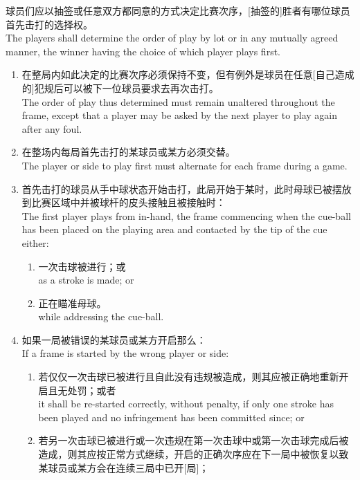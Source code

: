 \noindent 球员们应以抽签或任意双方都同意的方式决定比赛次序，[抽签的]胜者有哪位球员首先击打的选择权。\\
The players shall determine the order of play by lot or in any mutually agreed manner, the winner having the choice of which player plays first.
\begin{enumerate}[label=(\alph*)]
    \item 在整局内如此决定的比赛次序必须保持不变，但有例外是球员在任意[自己造成的]犯规后可以被下一位球员要求去再次击打。\\
    The order of play thus determined must remain unaltered throughout the frame, except that a player may be asked by the next player to play again after any foul.
    \item 在整场内每局首先击打的某球员或某方必须交替。\\
    The player or side to play first must alternate for each frame during a game.
    \item \label{2233c}首先击打的球员从手中球状态开始击打，此局开始于某时，此时母球已被摆放到比赛区域中并被球杆的皮头接触且被接触时：\\
    The first player plays from in-hand, the frame commencing when the cue-ball has been placed on the playing area and contacted by the tip of the cue either:
    \begin{enumerate}[label=(\roman*)]
        \item 一次击球被进行；或\\
        as a stroke is made; or
        \item 正在瞄准母球。\\
        while addressing the cue-ball.
    \end{enumerate}
    \item \label{2233d}如果一局被错误的某球员或某方开启那么：\\
    If a frame is started by the wrong player or side:
    \begin{enumerate}[label=(\roman*)]
        \item 若仅仅一次击球已被进行且自此没有违规被造成，则其应被正确地重新开启且无处罚；或者\\
        it shall be re-started correctly, without penalty, if only one stroke has been played and no infringement has been committed since; or
        \item 若另一次击球已被进行或一次违规在第一次击球中或第一次击球完成后被造成，则其应按正常方式继续，开启的正确次序应在下一局中被恢复以致某球员或某方会在连续三局中已开[局]；\\

\end{enumerate}
\end{enumerate}
